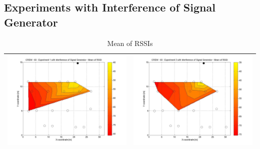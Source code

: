 \documentclass[11pt,a4paper,headinclude,footinclude,chapterprefix=on]{scrreprt}
\begin{document}
\subsection{Experiments with Interference of Signal Generator}
\begin{table}
	[h] \centering \caption{Mean of RSSIs} 
	\label{tb:63:Sig:mean} 
	\begin{tabular}
		{|l|l|} \hline 
		\includegraphics[width=8cm]{../../Source/plot/CREW_63/63_Sig_Ex_1_Mean.jpg} & 		\includegraphics[width=8cm]{../../Source/plot/CREW_63/63_Sig_Ex_2_Mean.jpg} \\
		\hline
	\end{tabular}
\end{table}
\end{document}
